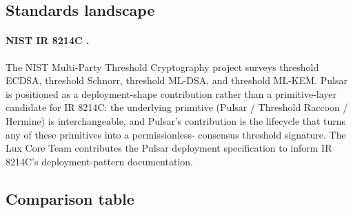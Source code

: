 \subsection{Standards landscape}
\label{sec:related:standards}

\paragraph{NIST IR 8214C \cite{nistir8214c}.} The NIST Multi-Party
Threshold Cryptography project surveys threshold ECDSA, threshold
Schnorr, threshold ML-DSA, and threshold ML-KEM. Pulsar is positioned
as a deployment-shape contribution rather than a primitive-layer
candidate for IR 8214C: the underlying primitive (Pulsar / Threshold
Raccoon / Hermine) is interchangeable, and Pulsar's contribution is
the lifecycle that turns any of these primitives into a permissionless-
consensus threshold signature. The Lux Core Team contributes the
Pulsar deployment specification to inform IR 8214C's
deployment-pattern documentation.

\subsection{Comparison table}
\label{sec:related:table}

